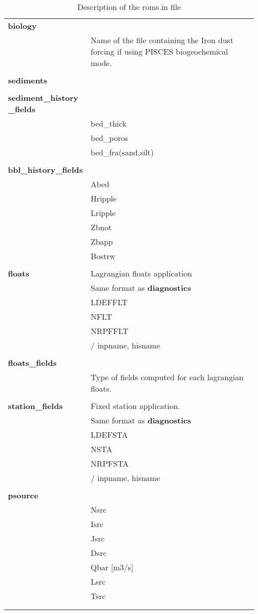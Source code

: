 \begin{longtable}{|p{0.25\linewidth}|p{0.75\linewidth}|}
\large{\textbf{biology}} &     \\
& Name of the file containing the Iron dust forcing if using PISCES biogeochemical
mode. \\
&  \\ 

\large{\textbf{sediments}} &     \\
&  \\ 

\large{\textbf{sediment\_history \_fields}} &     \\
& bed\_thick  \\
& bed\_poros \\ 
& bed\_fra(sand,silt) \\
&  \\ 

\large{\textbf{bbl\_history\_fields}} &     \\
& Abed  \\
& Hripple  \\
& Lripple  \\
& Zbnot  \\
& Zbapp  \\
& Bostrw \\
&  \\ 

\large{\textbf{floats}} & Lagrangian floats application \\
& Same format as \large{\textbf{diagnostics}}  \\
& LDEFFLT \\
& NFLT \\
& NRPFFLT  \\
& / inpname, hisname \\
&  \\ 

\large{\textbf{floats\_fields}} &     \\
& Type of fields computed for each lagrangian floats. \\
&  \\ 

\large{\textbf{station\_fields}} &  Fixed station application.   \\
& Same format as \large{\textbf{diagnostics}}  \\
& LDEFSTA \\
& NSTA    \\
& NRPFSTA \\
&/ inpname, hisname \\
&    \\

\large{\textbf{psource}} &     \\
& Nsrc   \\
& Isrc   \\
& Jsrc   \\
& Dsrc   \\
& Qbar [m3/s]   \\  
& Lsrc   \\      
& Tsrc   \\
&  \\ 
\hline
\caption{Description of the roms.in file}
\label{ta:desc_roms.in}
\end{longtable}

